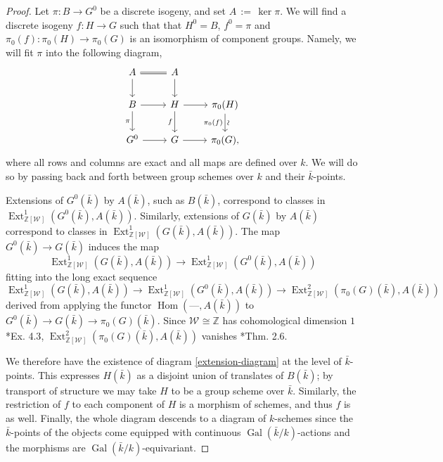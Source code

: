 \documentclass[CM,Submssn,SecEq]{degruyter-crelle} %
\theoremstyle{plain}
\theoremstyle{definition}
\theoremstyle{remark}
\newcommand{\ZZ}{{\mathbb{Z}}}
\newcommand{\bFq}{\bar{k}}
\newcommand{\Fq}{k}
\newcommand{\Weil}[1]{\mathcal{W}_{#1}}
\DeclareMathOperator{\Gal}{Gal}
\DeclareMathOperator{\Hom}{Hom}
\DeclareMathOperator{\Ext}{Ext}
\newcommand{\ceq}{{\, :=\, }}
\begin{document}
\begin{proof}
Let $\pi: B \to G^0$ be a discrete isogeny, and set $A \ceq \ker \pi$.
  We will find a discrete isogeny $f: H\to G$
  such that that $H^0 = B$, $f^0 =\pi$ and
  $\pi_0(f) : \pi_0(H)\to \pi_0(G)$ is an isomorphism of component
  groups.  Namely, we will fit $\pi$ into the following diagram,
  \begin{equation}\label{extension-diagram}
  \begin{tikzcd}
  A \arrow[equal]{r} \dar & A \dar \\
  B \rar \dar[swap]{\pi} & H \rar \dar[swap]{f} & \pi_0(H) \arrow{d}[below,rotate=90]{\sim}[swap]{\pi_0(f)} \\
  G^0 \rar & G \rar & \pi_0(G),
  \end{tikzcd}
  \end{equation}
  where all rows and columns are exact and all maps are defined over
  $\Fq$.  We will do so by passing back and forth between group
  schemes over $\Fq$ and their $\bFq$-points.

  Extensions of $G^0(\bFq)$ by $A(\bFq)$, such as $B(\bFq)$,
  correspond to classes in $\Ext^1_{\ZZ[\Weil{}]}(G^0(\bFq), A(\bFq))$.
  Similarly, extensions of $G(\bFq)$ by $A(\bFq)$ correspond to
  classes in $\Ext^1_{\ZZ[\Weil{}]}(G(\bFq), A(\bFq))$.  The map
  $G^0(\bFq) \to G(\bFq)$ induces the map
  \[
  \Ext^1_{\ZZ[\Weil{}]}(G(\bFq), A(\bFq)) \to \Ext^1_{\ZZ[\Weil{}]}(G^0(\bFq), A(\bFq))
  \]
  fitting into the long exact sequence 
  \[
  \Ext^1_{\ZZ[\Weil{}]}(G(\bFq), A(\bFq)) \to \Ext^1_{\ZZ[\Weil{}]}(G^0(\bFq), A(\bFq)) \to \Ext^2_{\ZZ[\Weil{}]}(\pi_0(G)(\bFq), A(\bFq))
  \]
  derived from applying
  the functor $\Hom(\mbox{---}, A(\bFq))$ to $G^0(\bFq) \to G(\bFq) \to \pi_0(G)(\bFq)$.
  Since $\Weil{} \cong \ZZ$ has cohomological dimension $1$ \cite{brown:CohomologyGrps}*{Ex. 4.3},
  $\Ext^2_{\ZZ[\Weil{}]}(\pi_0(G)(\bFq), A(\bFq))$ vanishes \cite{cartan-eilenberg:HomologicalAlgebra}*{Thm. 2.6}.

  We therefore have the existence of diagram \eqref{extension-diagram}
  at the level of $\bFq$-points.  This expresses $H(\bFq)$ as a
  disjoint union of translates of $B(\bFq)$; by transport of structure
  we may take $H$ to be a group scheme over $\bFq$.  Similarly, the
  restriction of $f$ to each component of $H$ is a morphism of
  schemes, and thus $f$ is as well.  Finally, the whole diagram
  descends to a diagram of $\Fq$-schemes since the $\bFq$-points of
  the objects come equipped with continuous $\Gal(\bFq/\Fq)$-actions and the
  morphisms are $\Gal(\bFq/\Fq)$-equivariant.
\end{proof}
\end{document}
